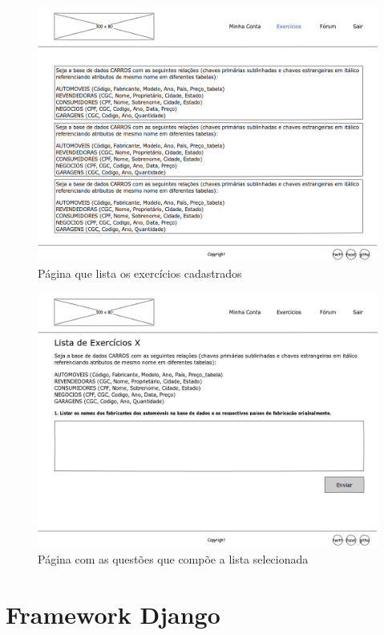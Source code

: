 \documentclass[graduacao,brazil]{ThesisPUC}
\begin{document}
\begin{figure}[H]
    \centering
    \includegraphics[width=\linewidth]{Imagens/ExercisePage.png}
    \caption{P\'{a}gina que lista os exerc\'{i}cios cadastrados}
\end{figure}

\begin{figure}[H]
    \centering
    \includegraphics[width=\linewidth]{Imagens/QuestionPage.png}
    \caption{P\'{a}gina com as quest\~{o}es que comp\~{o}e a lista selecionada}
\end{figure}

\section{Framework Django}
\end{document}
